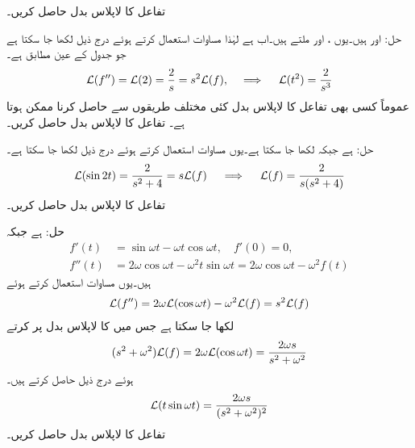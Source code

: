 تفاعل  کا لاپلاس بدل حاصل کریں۔

حل: اور  ہیں۔یوں ،  اور  ملتے ہیں۔اب  ہے لہٰذا  مساوات  استعمال کرتے ہوئے درج ذیل لکھا جا سکتا ہے جو جدول  کے عین مطابق ہے۔
\begin{align*}
\mathcal{L}(f'')=\mathcal{L}(2)=\frac{2}{s}=s^2\mathcal{L}(f), \quad \implies \quad \mathcal{L}(t^2)=\frac{2}{s^3}
\end{align*}
عموماً کسی بھی تفاعل کا لاپلاس بدل کئی مختلف طریقوں سے حاصل کرنا ممکن ہوتا ہے۔
تفاعل  کا لاپلاس بدل حاصل کریں۔

حل: ہے جبکہ  لکھا جا سکتا ہے۔یوں مساوات  استعمال کرتے ہوئے درج ذیل لکھا جا سکتا ہے۔ 
\begin{align*}
\mathcal{L}(\sin 2t)=\frac{2}{s^2+4}=s\mathcal{L}(f) \quad \implies \quad \mathcal{L}(f)=\frac{2}{s(s^2+4)}
\end{align*}
تفاعل  کا لاپلاس بدل حاصل کریں۔

حل: ہے جبکہ
\begin{align*}
f'(t)&=\sin \omega t-\omega t\cos \omega t, \quad f'(0)=0,\\
f''(t)&=2\omega \cos \omega t-\omega^2 t \sin \omega t=2\omega \cos \omega t-\omega^2 f(t)
\end{align*}
ہیں۔یوں مساوات  استعمال کرتے ہوئے
\begin{align*}
\mathcal{L}(f'')=2\omega \mathcal{L}(\cos \omega t)-\omega^2\mathcal{L}(f)=s^2\mathcal{L}(f)
\end{align*}
لکھا جا سکتا ہے جس میں  کا لاپلاس بدل پر کرتے 
\begin{align*}
(s^2+\omega^2)\mathcal{L}(f)=2\omega \mathcal{L}(\cos \omega t)=\frac{2\omega s}{s^2+\omega^2}
\end{align*}
ہوئے درج ذیل حاصل کرتے ہیں۔
\begin{align*}
\mathcal{L}(t\sin \omega t)=\frac{2\omega s}{(s^2+\omega^2)^2}
\end{align*}
تفاعل  کا لاپلاس بدل حاصل کریں۔

